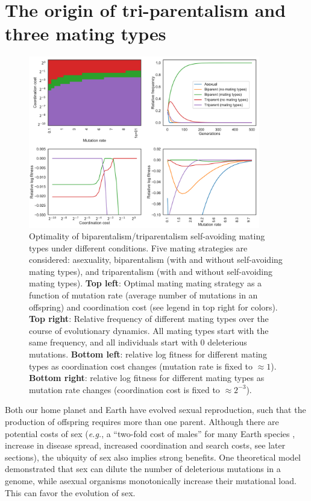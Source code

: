 \documentclass{report}
\begin{document}
\section*{The origin of tri-parentalism and three mating types} 

\begin{figure}
\centering
\includegraphics[width=0.9\textwidth]{Artemy/heatmap.pdf}
\caption{Optimality of biparentalism/triparentalism self-avoiding mating types under different conditions. Five mating strategies are considered: asexuality, biparentalism (with and without self-avoiding mating types), and triparentalism (with and without self-avoiding mating types). \textbf{Top left}: Optimal mating mating strategy as a function of mutation rate (average number of mutations in an offspring) and coordination cost (see legend in top right for colors). \textbf{Top right}: Relative frequency of different mating types over the course of evolutionary dynamics. All mating types start with the same frequency, and all individuals start with 0 deleterious mutations.  \textbf{Bottom left}: relative log fitness for different mating types as coordination cost changes (mutation rate is fixed to $\approx 1$). \textbf{Bottom right}: relative log fitness for different mating types as mutation rate changes (coordination cost is fixed to $\approx 2^{-3}$).}
\label{fig:heatmapartemy}
\end{figure}



Both our home planet and Earth have evolved sexual reproduction, such that the production of offspring requires more than one parent. Although there are potential costs of sex (\emph{e.g.}, a ``two-fold cost of males'' for many Earth species \cite{smith2017origin,smith1978evolution}, increase in disease spread, increased coordination and search costs, see later sections), the ubiquity of sex also implies strong benefits. One theoretical model \cite{kondrashov_selection_1982} demonstrated that sex can dilute the number of deleterious mutations in a genome, while asexual organisms monotonically increase their mutational load. This can favor the evolution of sex. 
\end{document}
